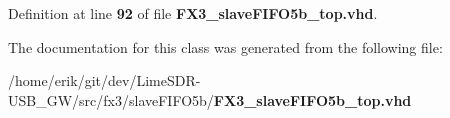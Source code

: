 Definition at line {\bf 92} of file {\bf F\+X3\+\_\+slave\+F\+I\+F\+O5b\+\_\+top.\+vhd}.



The documentation for this class was generated from the following file\+:\begin{DoxyCompactItemize}
\item 
/home/erik/git/dev/\+Lime\+S\+D\+R-\/\+U\+S\+B\+\_\+\+G\+W/src/fx3/slave\+F\+I\+F\+O5b/{\bf F\+X3\+\_\+slave\+F\+I\+F\+O5b\+\_\+top.\+vhd}\end{DoxyCompactItemize}
